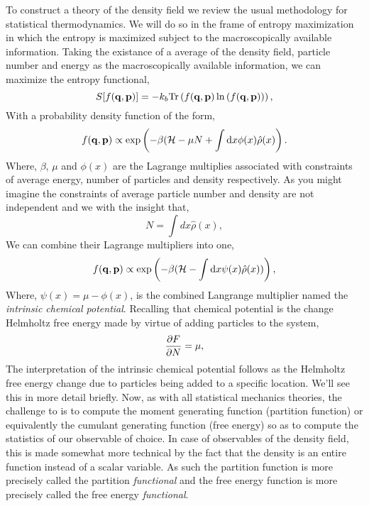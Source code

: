To construct a theory of the density field we review the usual methodology for statistical thermodynamics. We will do so in the frame of entropy maximization in which the entropy is maximized subject to the macroscopically available information. Taking the existance of a average of the density field, particle number and energy as the macroscopically available information, we can maximize the entropy functional, 
\begin{equation}
    S[f(\mathbf{q}, \mathbf{p})] = -k_b \mathrm{Tr}\left( f(\mathbf{q}, \mathbf{p})\ln\left(f(\mathbf{q}, \mathbf{p})\right) \right),
\end{equation}
%
With a probability density function of the form,
%
\begin{equation}
    f(\mathbf{q}, \mathbf{p}) \propto \exp\left(-\beta(\mathcal{H} -\mu N + \int \mathrm{d}x \phi(x)\hat{\rho}(x)\right).
\end{equation}
%
Where, $\beta$, $\mu$ and $\phi(x)$ are the Lagrange multiplies associated with constraints of average energy, number of particles and density respectively. As you might imagine the constraints of average particle number and density are not independent and we with the insight that,
%
\begin{equation}
    N = \int dx \hat{\rho}(x),
\end{equation}
%
We can combine their Lagrange multipliers into one,
%
\begin{equation}
    f(\mathbf{q}, \mathbf{p}) \propto \exp\left(- \beta(\mathcal{H} - \int \mathrm{d}x \psi(x) \hat{\rho}(x))\right),
\end{equation}
%
Where, $\psi(x) = \mu - \phi(x)$, is the combined Langrange multiplier named the \textit{intrinsic chemical potential}. Recalling that chemical potential is the change Helmholtz free energy made by virtue of adding particles to the system,
%
\begin{equation}
    \frac{\partial F}{\partial N} = \mu,
\end{equation}
%
The interpretation of the intrinsic chemical potential follows as the Helmholtz free energy change due to particles being added to a specific location.
We'll see this in more detail briefly.
Now, as with all statistical mechanics theories, the challenge to is to compute the moment generating function (partition function) or equivalently the cumulant generating function (free energy) so as to compute the statistics of our observable of choice.
In case of observables of the density field, this is made somewhat more technical by the fact that the density is an entire function instead of a scalar variable.
As such the partition function is more precisely called the partition \textit{functional} and the free energy function is more precisely called the free energy \textit{functional}.
